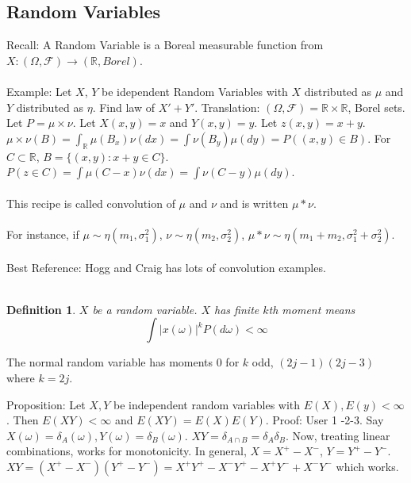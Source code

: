 \documentclass[12pt]{article}
\newtheorem{defn}{Definition}
\begin{document}
\subsection{Random Variables}
Recall: A Random Variable is a Boreal measurable function from $X: (\Omega, \mathcal{F}) \rightarrow ( \mathbb{R}, Borel)$.
\\ \\
Example: Let $X$, $Y$ be idependent Random Variables with $X$ distributed as $\mu$ and $Y$ distributed as $\eta$.  Find law of $X' + Y'$.  Translation: $(\Omega, \mathcal{F}) = \mathbb{R} \times \mathbb{R}$, Borel sets.  Let $P = \mu \times \nu$.  Let $X(x,y) = x$ and $Y(x,y) = y$.  Let $z(x,y) = x+y$.  $\mu \times \nu(B) = \int_\mathbb{R} \mu(B_x) \nu(dx) = \int \nu(B_y) \mu(dy) = P((x,y) \in B)$.  For $C \subset \mathbb{R}$, $B = \{ (x,y) : x + y \in C \}$.  $P( z \in C ) = \int \mu(C - x) \nu(dx) = \int \nu(C-y) \mu(dy)$.
\\ \\
This recipe is called convolution of $\mu$ and $\nu$ and is written $\mu * \nu$.
\\ \\
For instance, if $\mu \sim \eta( m_1, \sigma_1^2)$, $\nu \sim \eta(m_2, \sigma_2^2)$, $\mu * \nu \sim \eta(m_1 + m_2, \sigma_1^2 + \sigma_2^2)$.
\\ \\
Best Reference: Hogg and Craig has lots of convolution examples.
\\ \\
\begin{defn}
$X$ be a random variable.  $X$ has finite $k$th moment means
$$\int |x(\omega)|^k P(d \omega) < \infty$$
\end{defn}
The normal random variable has moments $0$ for $k$ odd, $(2j - 1)(2j - 3)$ where $k = 2j$.

Proposition: Let $X, Y$ be independent random variables with $E(X), E(y) < \infty$.  Then $E(XY) < \infty$ and $E(XY) = E(X) E(Y)$.  Proof: User 1 -2-3.  Say $X(\omega) = \delta_A(\omega), Y(\omega) = \delta_B(\omega)$.  $XY = \delta_{A \cap B} = \delta_A \delta_B$.  Now, treating linear combinations, works for monotonicity.  In general, $X = X^+ - X^-$, $Y = Y^+ - Y^-$.  $XY = (X^+ - X^-)(Y^+ - Y^-) = X^+ Y^+ - X^- Y^+ - X^+ Y^- + X^- Y^-$ which works.
\end{document}
